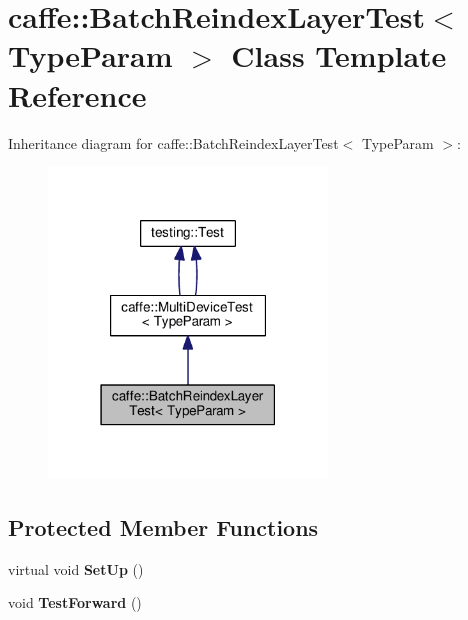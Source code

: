 \hypertarget{classcaffe_1_1_batch_reindex_layer_test}{}\section{caffe\+:\+:Batch\+Reindex\+Layer\+Test$<$ Type\+Param $>$ Class Template Reference}
\label{classcaffe_1_1_batch_reindex_layer_test}


Inheritance diagram for caffe\+:\+:Batch\+Reindex\+Layer\+Test$<$ Type\+Param $>$\+:
\nopagebreak
\begin{figure}[H]
\begin{center}
\leavevmode
\includegraphics[width=210pt]{classcaffe_1_1_batch_reindex_layer_test__inherit__graph}
\end{center}
\end{figure}
\subsection*{Protected Member Functions}
\begin{DoxyCompactItemize}
\item 
\mbox{\label{classcaffe_1_1_batch_reindex_layer_test_a893918c0257fd2bc9a542bea8887150c}} 
virtual void {\bfseries Set\+Up} ()
\item 
\mbox{\label{classcaffe_1_1_batch_reindex_layer_test_a0997e15335711bd07aeb843586fab927}} 
void {\bfseries Test\+Forward} ()
\end{DoxyCompactItemize}
